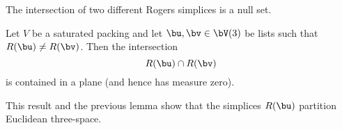 
The intersection of two different Rogers simplices is a null set.

\begin{lemma}  \label{lemma:R-inter} 
  Let $V$ be a saturated packing and let $\bu,\bv\in \bV(3)$ be lists
  such that $R(\bu)\ne R(\bv)$.  Then the intersection
\[  
R(\bu)\cap R(\bv)
\] 
is contained in a plane (and hence has measure zero).
\end{lemma}

This result and the previous lemma show that the simplices $R(\bu)$
partition Euclidean three-space.

